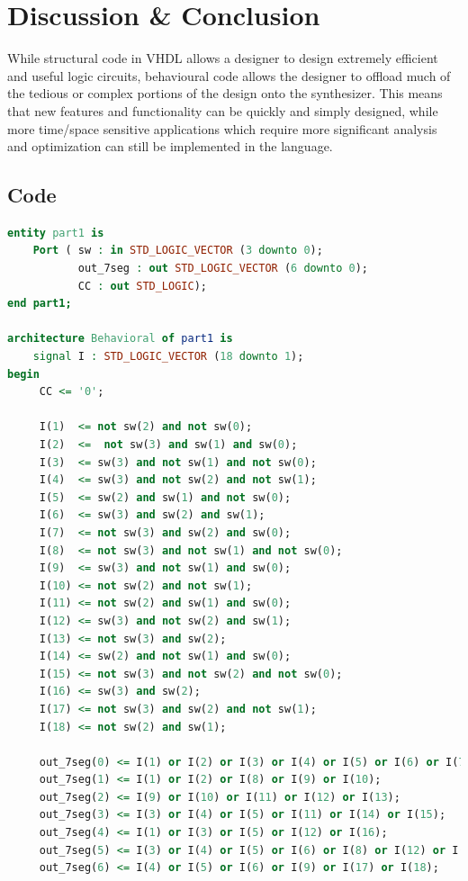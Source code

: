 \documentclass{article}
\begin{document}
\section{Discussion \& Conclusion}

While structural code in VHDL allows a designer to design extremely efficient and useful
logic circuits, behavioural code allows the designer to offload much of the tedious or complex
portions of the design onto the synthesizer.
This means that new features and functionality can be quickly and simply designed, while more time/space sensitive applications which require more significant analysis and optimization can still be implemented in the language.

\vskip 2cm

\begin{appendices}

\section{Code}

\begin{lstlisting}[language=VHDL]
entity part1 is
    Port ( sw : in STD_LOGIC_VECTOR (3 downto 0);
           out_7seg : out STD_LOGIC_VECTOR (6 downto 0);
           CC : out STD_LOGIC);
end part1;

architecture Behavioral of part1 is
    signal I : STD_LOGIC_VECTOR (18 downto 1);
begin
     CC <= '0';

     I(1)  <= not sw(2) and not sw(0);
     I(2)  <=  not sw(3) and sw(1) and sw(0);
     I(3)  <= sw(3) and not sw(1) and not sw(0);
     I(4)  <= sw(3) and not sw(2) and not sw(1);
     I(5)  <= sw(2) and sw(1) and not sw(0);
     I(6)  <= sw(3) and sw(2) and sw(1);
     I(7)  <= not sw(3) and sw(2) and sw(0);
     I(8)  <= not sw(3) and not sw(1) and not sw(0);
     I(9)  <= sw(3) and not sw(1) and sw(0);
     I(10) <= not sw(2) and not sw(1);
     I(11) <= not sw(2) and sw(1) and sw(0);
     I(12) <= sw(3) and not sw(2) and sw(1);
     I(13) <= not sw(3) and sw(2);
     I(14) <= sw(2) and not sw(1) and sw(0);
     I(15) <= not sw(3) and not sw(2) and not sw(0);
     I(16) <= sw(3) and sw(2);
     I(17) <= not sw(3) and sw(2) and not sw(1);
     I(18) <= not sw(2) and sw(1);
     
     out_7seg(0) <= I(1) or I(2) or I(3) or I(4) or I(5) or I(6) or I(7);
     out_7seg(1) <= I(1) or I(2) or I(8) or I(9) or I(10);
     out_7seg(2) <= I(9) or I(10) or I(11) or I(12) or I(13);
     out_7seg(3) <= I(3) or I(4) or I(5) or I(11) or I(14) or I(15);
     out_7seg(4) <= I(1) or I(3) or I(5) or I(12) or I(16);
     out_7seg(5) <= I(3) or I(4) or I(5) or I(6) or I(8) or I(12) or I(17);
     out_7seg(6) <= I(4) or I(5) or I(6) or I(9) or I(17) or I(18);


\end{lstlisting}
\end{appendices}
\end{document}
